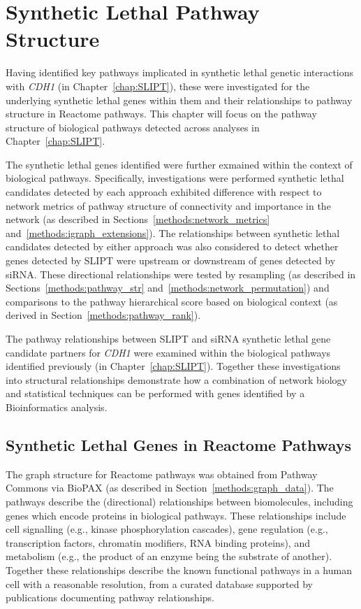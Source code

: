 \chapter{Synthetic Lethal Pathway Structure}
\label{chap:Pathways}
  
Having identified key pathways implicated in synthetic lethal genetic interactions with \textit{CDH1} (in Chapter~\ref{chap:SLIPT}), these were investigated for the underlying synthetic lethal genes within them and their relationships to pathway structure in Reactome pathways. This chapter will focus on the pathway structure of biological pathways detected across analyses in Chapter~\ref{chap:SLIPT}. 

The synthetic lethal genes identified were further exmained within the context of biological pathways. Specifically, investigations were performed synthetic lethal candidates detected by each approach exhibited difference with respect to network metrics of pathway structure of connectivity and importance in the network (as described in Sections~\ref{methods:network_metrics} and~\ref{methods:igraph_extensions}). The relationships between synthetic lethal candidates detected by either approach was also considered to detect whether genes detected by \gls{SLIPT} were upstream or downstream of genes detected by \gls{siRNA}. These directional relationships were tested by resampling (as described in Sections~\ref{methods:pathway_str} and~\ref{methods:network_permutation}) and comparisons to the pathway hierarchical score based on biological context (as derived in Section~\ref{methods:pathway_rank}). 

The pathway relationships between \gls{SLIPT} and \gls{siRNA} synthetic lethal gene candidate partners for \textit{CDH1} were examined within the biological pathways identified previously (in Chapter~\ref{chap:SLIPT}). Together these investigations into structural relationships demonstrate how a combination of network biology and statistical techniques can be performed with genes identified by a Bioinformatics analysis.

\FloatBarrier

\section{Synthetic Lethal Genes in Reactome Pathways} \label{chapt4:SL_Genes}

\FloatBarrier

The graph structure for Reactome pathways was obtained from Pathway Commons via \gls{BioPAX} (as described in Section~\ref{methods:graph_data}). The pathways describe the (directional) relationships between biomolecules, including genes which encode proteins in biological pathways. These relationships include cell signalling (e.g., kinase phosphorylation cascades), gene regulation (e.g., transcription factors, chromatin modifiers, \gls{RNA} binding proteins), and metabolism (e.g., the product of an enzyme being the substrate of another). Together these relationships describe the known functional pathways in a human cell with a reasonable resolution, from a curated database supported by publications documenting pathway relationships. 

